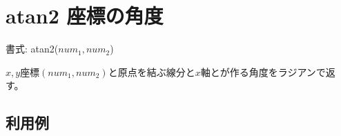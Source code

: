 
%

\section{atan2 座標の角度\label{sect:atan2}}

書式: atan2($num_1,num_2$)

$x,y$座標$(num_1,num_2)$と原点を結ぶ線分と$x$軸とが作る角度をラジアンで返す。

\subsection*{利用例}


%

